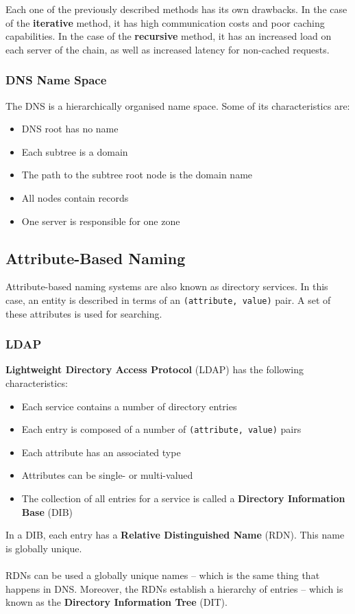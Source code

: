 \documentclass{article}
\begin{document}
\noindent Each one of the previously described methods has its own drawbacks. In the case of the \textbf{iterative} method, it has high communication costs and poor caching capabilities. In the case of the \textbf{recursive} method, it has an increased load on each server of the chain, as well as increased latency for non-cached requests.

\subsubsection{DNS Name Space}
The DNS is a hierarchically organised name space. Some of its characteristics are:

\begin{itemize}
	\item DNS root has no name
	\item Each subtree is a domain
	\item The path to the subtree root node is the domain name
	\item All nodes contain records
	\item One server is responsible for one zone
\end{itemize}

\subsection{Attribute-Based Naming}
Attribute-based naming systems are also known as directory services. In this case, an entity is described in terms of an \verb|(attribute, value)| pair. A set of these attributes is used for searching.

\subsubsection{LDAP}
\textbf{Lightweight Directory Access Protocol} (LDAP) has the following characteristics:

\begin{itemize}
	\item Each service contains a number of directory entries
	\item Each entry is composed of a number of \verb|(attribute, value)| pairs
	\item Each attribute has an associated type
	\item Attributes can be single- or multi-valued
	\item The collection of all entries for a service is called a \textbf{Directory Information Base} (DIB)
\end{itemize}

\noindent In a DIB, each entry has a \textbf{Relative Distinguished Name} (RDN). This name is globally unique. \\ \\
RDNs can be used a globally unique names -- which is the same thing that happens in DNS. Moreover, the RDNs establish a hierarchy of entries -- which is known as the \textbf{Directory Information Tree} (DIT).
\end{document}
